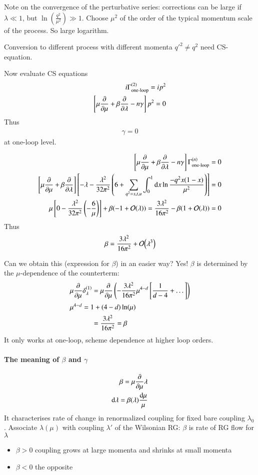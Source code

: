 Note on the convergence of the perturbative series: corrections can be large if $\lambda \ll 1$, but $\ln(\frac{q^2}{\mu^2}) \gg 1$. Choose $\mu^2$ of the order of the typical momentum scale of the process. So large logarithm. 

Conversion to different process with different momenta $q'^2 \neq q^2$ need CS-equation.

Now evaluate CS equations
\begin{align*}
   i\Gamma_\text{one-loop}^{(2)} = ip^2 \\
   \left[ \mu \pdv{\mu} + \beta \pdv{\lambda} - n\gamma \right] p^2 = 0
\end{align*}
Thus 
\begin{align}
   \gamma = 0
\end{align}
at one-loop level.

\begin{align*}
   \left[ \mu \pdv{\mu} + \beta \pdv{\lambda} - n \gamma \right] \Gamma_\text{one-loop}^{(n)} = 0\\
   \left[ \mu \pdv{\mu} + \beta \pdv{\lambda} \right] \left[ - \lambda - \frac{\lambda^2}{32\pi^2} \left( 6 + \sum_{q^2 = s,t,u} \int_0^1 \dd{x} \ln \frac{-q^2 x (1-x)}{\mu^2} \right) \right]  = 0 \\
   \mu \left[ 0 - \frac{\lambda^2}{32\pi^2} \left(- \frac{6}{\mu} \right) \right] + \beta ( - 1 +\order{\lambda}) = \frac{3\lambda^2}{16\pi^2} - \beta(1+\order{\lambda}) = 0
\end{align*}
Thus
\begin{align}
   \beta = \frac{3\lambda^2}{16\pi^2} + \order{\lambda^3} 
\end{align}

Can we obtain this (expression for $\beta$) in an easier way? Yes! $\beta$ is determined by the $\mu$-dependence of the counterterm:
\begin{align}
   \mu \pdv{\mu} \delta_\lambda^{(1)} &= \mu \pdv{\mu} \left( - \frac{3\lambda^2}{16 \pi^2} \mu^{4-d} \left[ \frac{1}{d-4} + \dots \right] \right) \\
   \shortintertext{$\mu^{4-d} = 1 + (4-d)\ln(\mu)$}
   &= \frac{3\lambda^2}{16\pi^2} = \beta
\end{align}
It only works at one-loop, scheme dependence at higher loop orders.

\paragraph{The meaning of $\beta$ and $\gamma$}
\begin{align*}
   \beta = \mu \pdv{\mu} \lambda \\
   \dd{\lambda} = \beta(\lambda) \frac{\dd{\mu}}{\mu}
\end{align*}
It characterises rate of change in renormalized coupling for fixed bare coupling $\lambda_0$.  Associate $\lambda(\mu)$ with coupling $\lambda'$ of the Wilsonian RG: $\beta$ is rate of RG flow for $\lambda$
\begin{itemize}
   \item $\beta > 0$ coupling grows  at large momenta and shrinks at small momenta
   \item $\beta < 0$ the opposite
\end{itemize}

